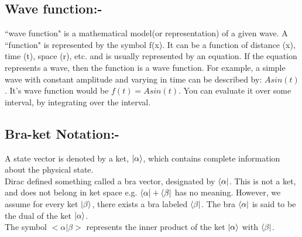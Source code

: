 \subsection{Wave function:-}
\hspace*{5cm} ``wave function" is a mathematical model(or representation) of a given wave. A ``function" is represented by the symbol f(x). It can be a function of distance (x), time (t), space (r), etc. and is usually represented by an equation. If the equation represents a wave, then the function is a wave function.
For example, a simple wave with constant amplitude and varying in time can be described by: $Asin(t)$. It's wave function would be $f(t)=Asin(t)$. You can evaluate it over some interval, by integrating over the interval.
\subsection{Bra-ket Notation:-}
 \hspace*{5cm} A state vector is denoted by a ket, $\ket{\alpha}$, which contains complete information about the physical state.\\
 Dirac defined something called a bra vector, designated by $ \bra{\alpha} $. This is not a ket, and does not belong in ket space e.g.  $ \bra{\alpha}+\bra{\beta}$ has no meaning. However, we assume for every ket $\ket{\beta}$, there exists a bra labeled $\bra{\beta}$. The bra $\bra{\alpha}$ is said to be the dual of the ket $\ket{\alpha}$.\\
 The symbol  $ <\alpha \vert \beta> $ represents the inner product of the ket $\ket{\alpha}$ with $\bra{\beta}$.
 
